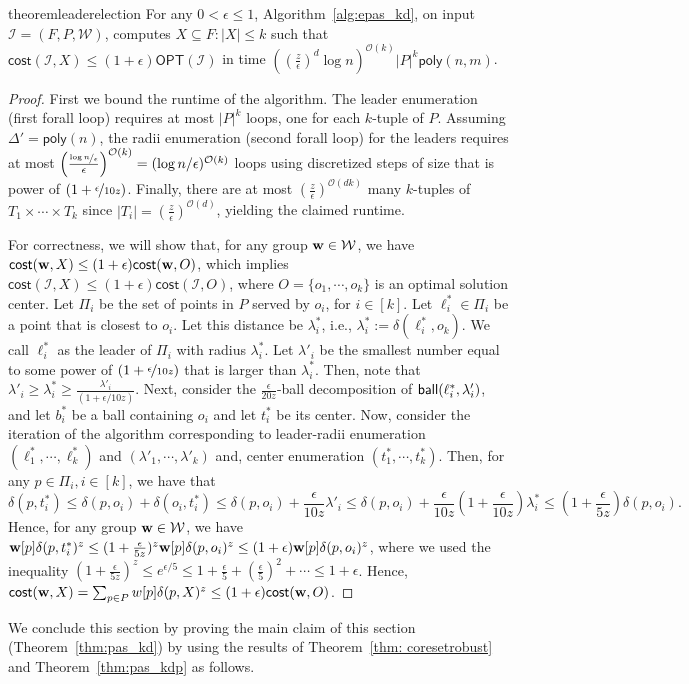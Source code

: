 \documentclass[11pt]{article}
\newcommand{\opt}{\ensuremath{\textsf{OPT}}}
\newcommand{\cost}{\ensuremath{\textsf{cost}}}
\newcommand{\poly}{\ensuremath{\textsf{poly}}}
\newcommand{\ball}{{\sf ball}}
\newcommand{\bigO}[1]{\ensuremath{\mathcal{O}\left(#1\right)}}
\newcommand{\vecw}{{\bf w}\xspace}
\newcommand{\cI}{\ensuremath{\mathcal{I}}\xspace}
\newcommand{\cW}{\ensuremath{\mathcal{W}}\xspace}
\begin{document}
\begin{restatable}{theorem}{leaderelection}\label{thm:pas_kdp}
For any $0< \epsilon \le 1$, Algorithm~\ref{alg:epas_kd}, on input $\cI= (F,P,\cW)$, computes $X \subseteq F: |X| \le k$ such that $\cost({\cI},X) \le (1+ \epsilon)\opt(\cI)$
in time $\left((\frac{z}{\epsilon})^d \log n \right)^{\bigO{k}}|P|^{k}   \poly(n,m)$.

\end{restatable}
\begin{proof}
First we bound the runtime of the algorithm. The leader enumeration (first forall loop) requires at most  $|P|^k$ loops, one for each $k$-tuple of $P$. 
Assuming $\Delta' = \poly(n)$,
the radii enumeration (second forall loop) for the leaders requires at most $\left(\frac{\nicefrac{\log n}{\epsilon}}{\epsilon}\right)^{\bigO{k}} = (\log n/\epsilon)^{\bigO{k}} $ loops using discretized steps of size that is power of $(1+\nicefrac{\epsilon}{10z})$.
Finally, there are at most $(\frac{z}{\epsilon})^{\bigO{dk}}$ many $k$-tuples of $T_1\times \cdots \times T_k$ since $|T_i| = (\frac{z}{\epsilon})^{\bigO{d}}$, yielding the claimed runtime.

For correctness, we will show that, for any group $\vecw \in \cW$, we have $\cost(\vecw,X) \le (1+\epsilon)\cost(\vecw,O)$, which implies  $\cost({\cI},X) \le (1+\epsilon)\cost({\cI},O)$, where $O =\{o_1,\cdots, o_k\}$ is an optimal solution center. Let $\Pi_i$ be the set of points in $P$ served by $o_i$, for $i \in [k]$. Let $\ell^*_i \in \Pi_i$ be a  point that is closest to $o_i$. Let this distance be $\lambda^*_i$, i.e., $\lambda^*_i := \delta(\ell^*_i,o_k)$. We call $\ell^*_i$ as the leader of $\Pi_i$ with radius $\lambda^*_i$.
Let $\lambda'_i$ be the smallest number equal to some power of $(1+\nicefrac{\epsilon}{10z})$ that is larger than $\lambda^*_i$. Then, note that $\lambda'_i \ge \lambda^*_i \ge \frac{\lambda'_i}{(1+\epsilon/10z)}$. 
Next, consider the $\frac{\epsilon}{20z}$-ball decomposition of $\ball(\ell^*_i,\lambda'_i)$, and let $b^*_i$ be a ball containing $o_i$  and let $t^*_i$ be its center. Now, consider the iteration of the algorithm corresponding to leader-radii enumeration $(\ell^*_1,\cdots,\ell^*_k)$ and $(\lambda'_1,\cdots,\lambda'_k)$ and, center enumeration $(t^*_1,\cdots, t^*_k)$. Then, for any $p \in \Pi_i, i \in [k]$, we have that
\[
\delta(p,t^*_i) \le \delta(p,o_i) + \delta(o_i,t^*_i)  \le \delta(p,o_i) + \frac{\epsilon}{10z} \lambda'_i \le  \delta(p,o_i) + \frac{\epsilon}{10z} \left(1+\frac{\epsilon}{10z}\right)\lambda^*_i \le  \left(1+\frac{\epsilon}{5z}\right) \delta(p,o_i).
\]
Hence, for any group $\vecw \in \cW$, we have
$\vecw[p] \delta(p,t^*_i)^z \le (1+\frac{\epsilon}{5z})^z \vecw[p]\delta(p,o_i)^z \le (1+\epsilon) \vecw[p]\delta(p,o_i)^z $, where we used the inequality $(1+\frac{\epsilon}{5z})^z \le e^{\epsilon/5} \le 1+ \frac{\epsilon}{5} + (\frac{\epsilon}{5})^2 + \cdots  \le 1+ \epsilon$.
Hence, $\cost(\vecw,X) = \sum_{p\in P}w[p]\delta(p,X)^z \le (1+\epsilon)\cost(\vecw,O)$.
\end{proof}
We conclude this section by proving the main claim of this section (Theorem~\ref{thm:pas_kd}) by using the results of Theorem~\ref{thm: coresetrobust} and Theorem~\ref{thm:pas_kdp} as follows.
\end{document}
